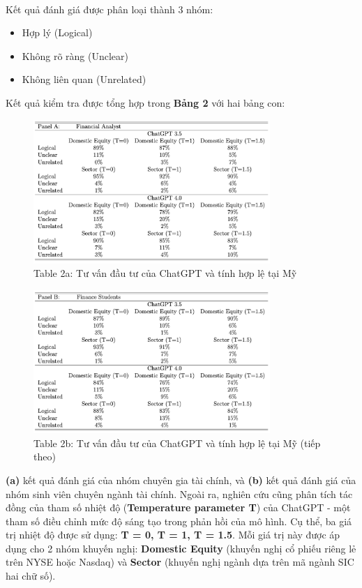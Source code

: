 \documentclass[a4paper,12pt]{article}
\begin{document}
\\ Kết quả đánh giá được phân loại thành 3 nhóm:

\begin{itemize}
    \item Hợp lý (Logical)
    \item Không rõ ràng (Unclear)
    \item Không liên quan (Unrelated)
\end{itemize}
Kết quả kiểm tra được tổng hợp trong \textbf{Bảng 2} với hai bảng con: 
\begin{figure}[H]
    \centering
    \includegraphics[width=0.8\textwidth]{table/tab2a.png}
    \caption*{Table 2a: Tư vấn đầu tư của ChatGPT và tính hợp lệ tại Mỹ}
    \label{fig:fig2}
\end{figure}
\begin{figure}[H]
    \centering
    \includegraphics[width=0.8\textwidth]{table/tab2b.png}
    \caption*{Table 2b: Tư vấn đầu tư của ChatGPT và tính hợp lệ tại Mỹ (tiếp theo)}
    \label{fig:fig2}
\end{figure}
\textbf{(a)} kết quả đánh giá của nhóm chuyên gia tài chính, và \textbf{(b)} kết quả đánh giá của nhóm sinh viên chuyên ngành tài chính. Ngoài ra, nghiên cứu cũng phân tích tác đồng của tham số nhiệt độ (\textbf{Temperature parameter T}) của ChatGPT - một tham số điều chỉnh mức độ sáng tạo trong phản hồi của mô hình. Cụ thể, ba giá trị nhiệt độ được sử dụng: \textbf{T = 0, T = 1, T = 1.5}. Mỗi giá trị này được áp dụng cho 2 nhóm khuyến nghị: \textbf{Domestic Equity} (khuyến nghị cổ phiếu riêng lẻ trên NYSE hoặc Nasdaq) và \textbf{Sector} (khuyến nghị ngành dựa trên mã ngành SIC hai chữ số).
\end{document}
